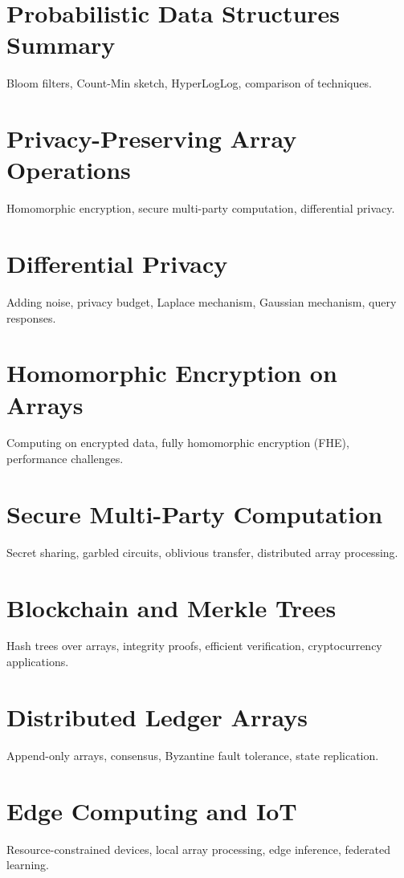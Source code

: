 \chapter{Probabilistic Data Structures Summary}
Bloom filters, Count-Min sketch, HyperLogLog, comparison of techniques.


\chapter{Privacy-Preserving Array Operations}
Homomorphic encryption, secure multi-party computation, differential privacy.

\chapter{Differential Privacy}
Adding noise, privacy budget, Laplace mechanism, Gaussian mechanism, query responses.

\chapter{Homomorphic Encryption on Arrays}
Computing on encrypted data, fully homomorphic encryption (FHE), performance challenges.

\chapter{Secure Multi-Party Computation}
Secret sharing, garbled circuits, oblivious transfer, distributed array processing.

\chapter{Blockchain and Merkle Trees}
Hash trees over arrays, integrity proofs, efficient verification, cryptocurrency applications.

\chapter{Distributed Ledger Arrays}
Append-only arrays, consensus, Byzantine fault tolerance, state replication.


\chapter{Edge Computing and IoT}
Resource-constrained devices, local array processing, edge inference, federated learning.

